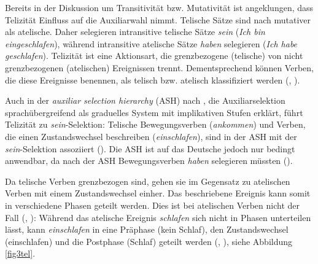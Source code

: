 Bereits in der Diskussion um Transitivität bzw. Mutativität ist angeklungen, dass Telizität Einfluss auf die Auxiliarwahl nimmt. Telische Sätze sind nach \textcite{Shannon.1995} mutativer als atelische. Daher selegieren intransitive telische Sätze \textit{sein} (\textit{Ich bin eingeschlafen}), während intransitive atelische Sätze \textit{haben} selegieren (\textit{Ich habe geschlafen}). Telizität ist eine Aktionsart, die grenzbezogene (telische) von nicht grenzbezogenen (atelischen) Ereignissen trennt. Dementsprechend können Verben, die diese Ereignisse benennen, als telisch bzw. atelisch klassifiziert werden (\cite[132]{Shannon.1995}, \cite[33]{Gillmann.2016}). 

 

Auch in der \textit{auxiliar selection hierarchy} (ASH) nach \textcite{Sorace.2000}, die Auxiliarselektion sprachübergreifend als graduelles System mit implikativen Stufen erklärt, führt Telizität zu \textit{sein}-Selektion: Telische Bewegungsverben (\textit{ankommen}) und Verben, die einen Zustandswechsel beschreiben (\textit{einschlafen}), sind in der ASH mit der \textit{sein}-Selektion assoziiert (\cite[863--867]{Sorace.2000}). Die ASH ist auf das Deutsche jedoch nur bedingt anwendbar, da nach der ASH Bewegungsverben \textit{haben} selegieren müssten (\cite[108--116]{Gillmann.2016}).  

Da telische Verben grenzbezogen sind, gehen sie im Gegensatz zu atelischen Verben mit einem Zustandswechsel einher. Das beschriebene Ereignis kann somit in verschiedene Phasen geteilt werden. Dies ist bei atelischen Verben nicht der Fall (\cite[102--104]{Teuber.2005}, \cite[32--35]{Gillmann.2016}): Während das atelische Ereignis \textit{schlafen} sich nicht in Phasen unterteilen lässt, kann \textit{einschlafen} in eine Präphase (kein Schlaf), den Zustandswechsel (einschlafen) und die Postphase (Schlaf) geteilt werden (\cite[103]{Teuber.2005}, \cite[33]{Gillmann.2016}), siehe Abbildung \ref{fig3tel}. 


